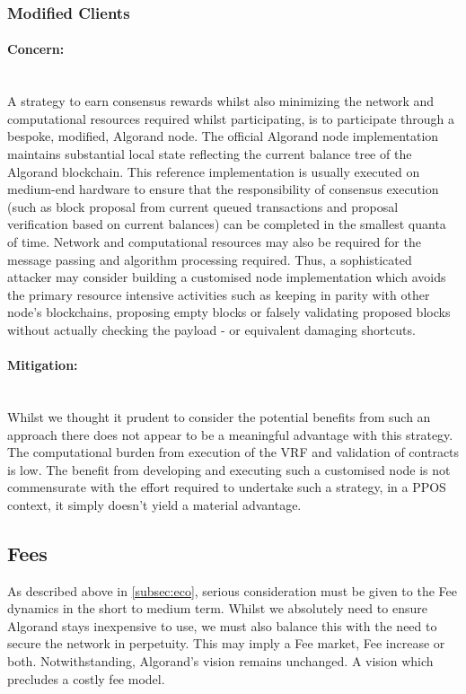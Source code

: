\documentclass[11pt,a4paper]{article}
\begin{document}
\pagebreak

\subsubsection{Modified Clients}

\paragraph{Concern:} \mbox{}\\
A strategy to earn consensus rewards whilst also minimizing the network and computational resources required whilst 
participating, is to participate through a bespoke, modified, Algorand node. The official Algorand node implementation 
maintains substantial local state reflecting the current balance tree of the Algorand blockchain. This reference 
implementation is usually executed on medium-end hardware to ensure that the responsibility of consensus execution (such 
as block proposal from current queued transactions and proposal verification based on current balances) can be completed 
in the smallest quanta of time. Network and computational resources may also be required for the message passing and  
algorithm processing required. Thus, a sophisticated attacker may consider building a customised node implementation 
which avoids the primary resource intensive activities such as keeping in parity with other node's blockchains, 
proposing empty blocks or falsely validating proposed blocks without actually checking the payload - or equivalent 
damaging shortcuts. 

\paragraph{Mitigation:} \mbox{}\\
Whilst we thought it prudent to consider the potential benefits from such an approach there does not appear to be a 
meaningful advantage with this strategy. The computational burden from execution of the VRF and validation of contracts 
is low. The benefit from developing and executing such a customised node is not commensurate with the effort required to
undertake such a strategy, in a PPOS context, it simply doesn't yield a material advantage. 

\pagebreak

\subsection{Fees}
As described above in \ref{subsec:eco}, serious consideration must be given to the Fee dynamics in the short to medium 
term. Whilst we absolutely need to ensure Algorand stays inexpensive to use, we must also balance this with the need to 
secure the network in perpetuity. This may imply a Fee market, Fee increase or both. Notwithstanding, Algorand's vision 
remains unchanged. A vision which precludes a costly fee model.
\end{document}
